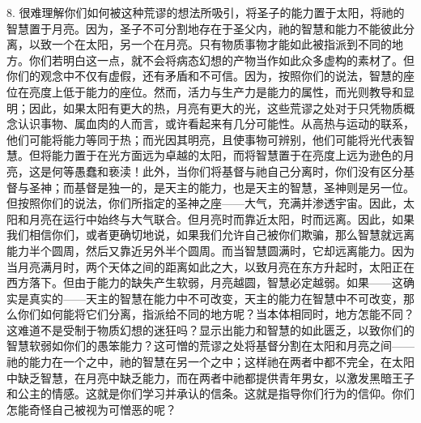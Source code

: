 8. 很难理解你们如何被这种荒谬的想法所吸引，将圣子的能力置于太阳，将祂的智慧置于月亮。因为，圣子不可分割地存在于圣父内，祂的智慧和能力不能彼此分离，以致一个在太阳，另一个在月亮。只有物质事物才能如此被指派到不同的地方。你们若明白这一点，就不会将病态幻想的产物当作如此众多虚构的素材了。但你们的观念中不仅有虚假，还有矛盾和不可信。因为，按照你们的说法，智慧的座位在亮度上低于能力的座位。然而，活力与生产力是能力的属性，而光则教导和显明；因此，如果太阳有更大的热，月亮有更大的光，这些荒谬之处对于只凭物质概念认识事物、属血肉的人而言，或许看起来有几分可能性。从高热与运动的联系，他们可能将能力等同于热；而光因其明亮，且使事物可辨别，他们可能将光代表智慧。但将能力置于在光方面远为卓越的太阳，而将智慧置于在亮度上远为逊色的月亮，这是何等愚蠢和亵渎！此外，当你们将基督与祂自己分离时，你们没有区分基督与圣神；而基督是独一的，是天主的能力，也是天主的智慧，圣神则是另一位。但按照你们的说法，你们所指定的圣神之座——大气，充满并渗透宇宙。因此，太阳和月亮在运行中始终与大气联合。但月亮时而靠近太阳，时而远离。因此，如果我们相信你们，或者更确切地说，如果我们允许自己被你们欺骗，那么智慧就远离能力半个圆周，然后又靠近另外半个圆周。而当智慧圆满时，它却远离能力。因为当月亮满月时，两个天体之间的距离如此之大，以致月亮在东方升起时，太阳正在西方落下。但由于能力的缺失产生软弱，月亮越圆，智慧必定越弱。如果——这确实是真实的——天主的智慧在能力中不可改变，天主的能力在智慧中不可改变，那么你们如何能将它们分离，指派给不同的地方呢？当本体相同时，地方怎能不同？这难道不是受制于物质幻想的迷狂吗？显示出能力和智慧的如此匮乏，以致你们的智慧软弱如你们的愚笨能力？这可憎的荒谬之处将基督分割在太阳和月亮之间——祂的能力在一个之中，祂的智慧在另一个之中；这样祂在两者中都不完全，在太阳中缺乏智慧，在月亮中缺乏能力，而在两者中祂都提供青年男女，以激发黑暗王子和公主的情感。这就是你们学习并承认的信条。这就是指导你们行为的信仰。你们怎能奇怪自己被视为可憎恶的呢？\par

